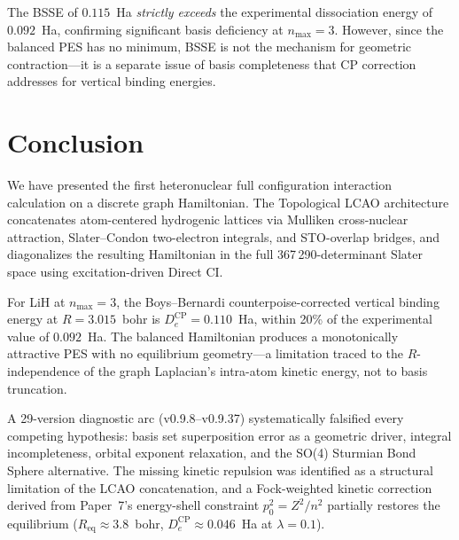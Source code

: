 \documentclass[aps,pra,twocolumn,superscriptaddress,longbibliography]{revtex4-2}
\begin{document}
The BSSE of $0.115$~Ha \emph{strictly exceeds} the experimental
dissociation energy of $0.092$~Ha, confirming significant basis
deficiency at $n_{\max}=3$.  However, since the balanced PES has no
minimum, BSSE is not the mechanism for geometric contraction---it is a
separate issue of basis completeness that CP correction addresses for
vertical binding energies.

\section{Conclusion}
\label{sec:conclusion}

We have presented the first heteronuclear full configuration interaction
calculation on a discrete graph Hamiltonian.  The Topological LCAO
architecture concatenates atom-centered hydrogenic lattices via Mulliken
cross-nuclear attraction, Slater--Condon two-electron integrals, and
STO-overlap bridges, and diagonalizes the resulting Hamiltonian in the
full 367\,290-determinant Slater space using excitation-driven Direct CI.

For LiH at $n_{\max}=3$, the Boys--Bernardi counterpoise-corrected
vertical binding energy at $R=3.015$~bohr is
$D_e^{\mathrm{CP}}=0.110$~Ha, within 20\% of the experimental value
of $0.092$~Ha.  The balanced Hamiltonian produces a monotonically
attractive PES with no equilibrium geometry---a limitation traced to
the $R$-independence of the graph Laplacian's intra-atom kinetic
energy, not to basis truncation.

A 29-version diagnostic arc (v0.9.8--v0.9.37) systematically falsified
every competing hypothesis: basis set superposition error as a geometric
driver, integral incompleteness, orbital exponent relaxation, and the
SO(4) Sturmian Bond Sphere alternative.  The missing kinetic repulsion
was identified as a structural limitation of the LCAO concatenation,
and a Fock-weighted kinetic correction derived from Paper~7's
energy-shell constraint $p_0^2 = Z^2/n^2$ partially restores the
equilibrium ($R_{\mathrm{eq}} \approx 3.8$~bohr,
$D_e^{\mathrm{CP}} \approx 0.046$~Ha at $\lambda = 0.1$).
\end{document}
